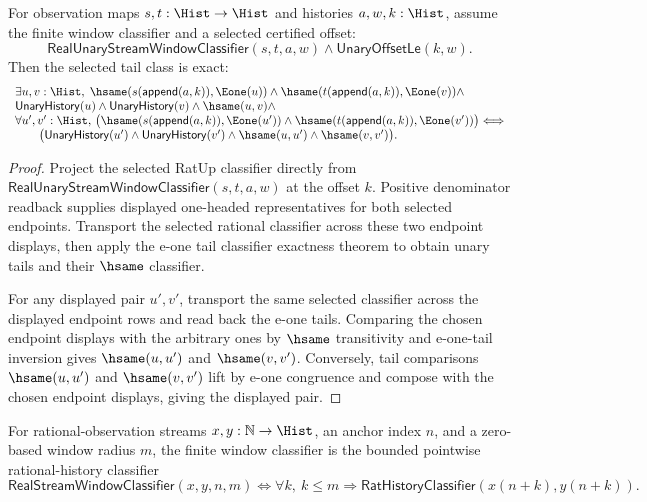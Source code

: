 \begin{theorem}
\label{thm:real-unary-stream-window-selected-tail-class-exactness-from-window}
For observation maps $s,t:\Hist\to\Hist$ and histories $a,w,k:\Hist$, assume
the finite window classifier and a selected certified offset:
$$
\mathsf{RealUnaryStreamWindowClassifier}(s,t,a,w)
\land
\mathsf{UnaryOffsetLe}(k,w).
$$
Then the selected tail class is exact:
$$
\begin{array}{l}
\exists u,v:\Hist,\;
\hsame(s(\mathsf{append}(a,k)),\Eone(u))\land
\hsame(t(\mathsf{append}(a,k)),\Eone(v))\land\\
\mathsf{UnaryHistory}(u)\land
\mathsf{UnaryHistory}(v)\land
\hsame(u,v)\land\\
\forall u',v':\Hist,\,
\bigl(\hsame(s(\mathsf{append}(a,k)),\Eone(u'))\land
\hsame(t(\mathsf{append}(a,k)),\Eone(v'))\bigr)
\Longleftrightarrow\\
\qquad
\bigl(\mathsf{UnaryHistory}(u')\land
\mathsf{UnaryHistory}(v')\land
\hsame(u,u')\land
\hsame(v,v')\bigr).
\end{array}
$$
\end{theorem}
\begin{proof}
Project the selected RatUp classifier directly from
$\mathsf{RealUnaryStreamWindowClassifier}(s,t,a,w)$ at the offset $k$. Positive
denominator readback supplies displayed one-headed representatives for both
selected endpoints. Transport the selected rational classifier across these
two endpoint displays, then apply the e-one tail classifier exactness theorem
to obtain unary tails and their $\hsame$ classifier.

For any displayed pair $u',v'$, transport the same selected classifier across
the displayed endpoint rows and read back the e-one tails. Comparing the chosen
endpoint displays with the arbitrary ones by $\hsame$ transitivity and
e-one-tail inversion gives $\hsame(u,u')$ and $\hsame(v,v')$. Conversely,
tail comparisons $\hsame(u,u')$ and $\hsame(v,v')$ lift by e-one congruence and
compose with the chosen endpoint displays, giving the displayed pair.
\end{proof}

\begin{definition}
\label{def:real-stream-finite-window-classifier}
For rational-observation streams $x,y:\mathbb{N}\to\Hist$, an anchor index $n$,
and a zero-based window radius $m$, the finite window classifier is the bounded
pointwise rational-history classifier
$$
\mathsf{RealStreamWindowClassifier}(x,y,n,m)
\Longleftrightarrow
\forall k,\ k\le m\Longrightarrow
\mathsf{RatHistoryClassifier}(x(n+k),y(n+k)).
$$
\end{definition}

